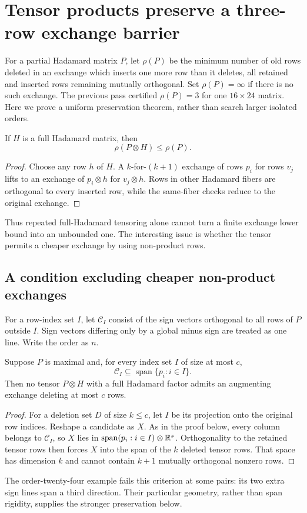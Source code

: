 \section{Tensor products preserve a three-row exchange barrier}
For a partial Hadamard matrix $P$, let $\rho(P)$ be the minimum number
of old rows deleted in an exchange which inserts one more row than it
deletes, all retained and inserted rows remaining mutually orthogonal.
Set $\rho(P)=\infty$ if there is no such exchange. The previous pass
certified $\rho(P)=3$ for one $16\times24$ matrix. Here we prove a
uniform preservation theorem, rather than search larger isolated orders.


\begin{proposition}
If $H$ is a full Hadamard matrix, then
\[
 \rho(P\otimes H)\le\rho(P).
\]
\end{proposition}
\begin{proof}
Choose any row $h$ of $H$. A $k$-for-$(k+1)$ exchange of rows $p_i$
for rows $v_j$ lifts to an exchange of $p_i\otimes h$ for $v_j\otimes h$.
Rows in other Hadamard fibers are orthogonal to every inserted row,
while the same-fiber checks reduce to the original exchange.
\end{proof}
Thus repeated full-Hadamard tensoring alone cannot turn a finite
exchange lower bound into an unbounded one. The interesting issue is
whether the tensor permits a cheaper exchange by using non-product rows.

\subsection{A condition excluding cheaper non-product exchanges}
For a row-index set $I$, let $\mathcal C_I$ consist of the sign vectors
orthogonal to all rows of $P$ outside $I$. Sign vectors differing only
by a global minus sign are treated as one line. Write the order as $n$.

\begin{proposition}
Suppose $P$ is maximal and, for every index set $I$ of size at most $c$,
\[
 \mathcal C_I\subseteq\operatorname{span}\{p_i:i\in I\}.
\]
Then no tensor $P\otimes H$ with a full Hadamard factor admits an
augmenting exchange deleting at most $c$ rows.
\end{proposition}
\begin{proof}
For a deletion set $D$ of size $k\le c$, let $I$ be its projection
onto the original row indices. Reshape a candidate as $X$. As in the
proof below, every column belongs to $\mathcal C_I$, so $X$ lies in
$\operatorname{span}(p_i:i\in I)\otimes\mathbb R^s$. Orthogonality to the
retained tensor rows then forces $X$ into the span of the $k$ deleted
tensor rows. That space has dimension $k$ and cannot contain $k+1$
mutually orthogonal nonzero rows.
\end{proof}
The order-twenty-four example fails this criterion at some pairs: its
two extra sign lines span a third direction. Their particular geometry,
rather than span rigidity, supplies the stronger preservation below.

